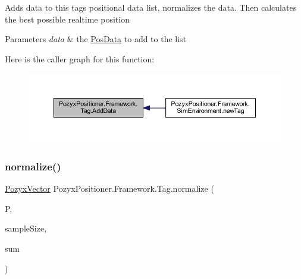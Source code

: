 Adds data to this tag\textquotesingle{}s positional data list, normalizes the data. Then calculates the best possible realtime position 


\begin{DoxyParams}{Parameters}
{\em data} & the \hyperlink{struct_pozyx_positioner_1_1_framework_1_1_pos_data}{Pos\+Data} to add to the list\\
\hline
\end{DoxyParams}
Here is the caller graph for this function\+:
\nopagebreak
\begin{figure}[H]
\begin{center}
\leavevmode
\includegraphics[width=350pt]{class_pozyx_positioner_1_1_framework_1_1_tag_ac2741e137c420ad71f64ee2d3d5fefe8_icgraph}
\end{center}
\end{figure}
\mbox{\label{class_pozyx_positioner_1_1_framework_1_1_tag_ad660c4234e2e962b72737bff03665df9}} 
\subsubsection{\texorpdfstring{normalize()}{normalize()}}
{\footnotesize\ttfamily \hyperlink{struct_pozyx_positioner_1_1_framework_1_1_pozyx_vector}{Pozyx\+Vector} Pozyx\+Positioner.\+Framework.\+Tag.\+normalize (\begin{DoxyParamCaption}\item[{\hyperlink{struct_pozyx_positioner_1_1_framework_1_1_pozyx_vector}{Pozyx\+Vector} \mbox{[}$\,$\mbox{]}}]{P,  }\item[{int}]{sample\+Size,  }\item[{\hyperlink{struct_pozyx_positioner_1_1_framework_1_1_pozyx_vector}{Pozyx\+Vector}}]{sum }\end{DoxyParamCaption})\hspace{0.3cm}{\ttfamily [private]}}



